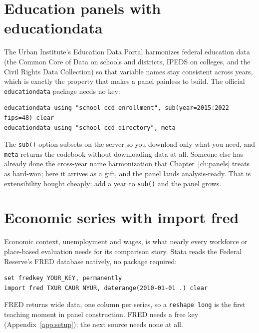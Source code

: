 \documentclass[
    a4paper,
    fontsize=10pt,
    twoside=true,
    numbers=noenddot,
]{kaobook}
\begin{document}
\section{Education panels with educationdata}
The Urban Institute's Education Data Portal harmonizes federal education data (the Common Core of Data on schools and districts, IPEDS on colleges, and the Civil Rights Data Collection) so that variable names stay consistent across years, which is exactly the property that makes a panel painless to build. The official \texttt{educationdata} package needs no key:
{\footnotesize
\begin{verbatim}
educationdata using "school ccd enrollment", sub(year=2015:2022 fips=48) clear
educationdata using "school ccd directory", meta
\end{verbatim}
}
The \texttt{sub()} option subsets on the server so you download only what you need, and \texttt{meta} returns the codebook without downloading data at all. Someone else has already done the cross-year name harmonization that Chapter~\ref{ch:panels} treats as hard-won; here it arrives as a gift, and the panel lands analysis-ready. That is extensibility bought cheaply: add a year to \texttt{sub()} and the panel grows.

\section{Economic series with import fred}
Economic context, unemployment and wages, is what nearly every workforce or place-based evaluation needs for its comparison story. Stata reads the Federal Reserve's FRED database natively, no package required:
{\footnotesize
\begin{verbatim}
set fredkey YOUR_KEY, permanently
import fred TXUR CAUR NYUR, daterange(2010-01-01 .) clear
\end{verbatim}
}
FRED returns wide data, one column per series, so a \texttt{reshape long} is the first teaching moment in panel construction. FRED needs a free key (Appendix~\ref{app:setup}); the next source needs none at all.
\end{document}
